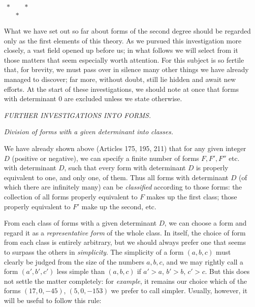 \begin{center}
$\begin{array}{ccc}\ast&&\ast\\&\ast&\end{array}$
\end{center}

What we have set out so far about forms of the second degree should be regarded only as the first elements of this theory. As we pursued this investigation more closely, a vast field opened up before us; in what follows we will select from it those matters that seem especially worth attention. For this subject is so fertile that, for brevity, we must pass over in silence many other things we have already managed to discover; far more, without doubt, still lie hidden and await new efforts. At the start of these investigations, we should note at once that forms with determinant $0$ are excluded unless we state otherwise.

\begin{center}
\textit{FURTHER INVESTIGATIONS INTO FORMS.}
\end{center}

\begin{center}
\textit{Division of forms with a given determinant into classes.}
\end{center}

We have already shown above (Articles 175, 195, 211) that for any given integer $D$ (positive or negative), we can specify a finite number of forms $F,F',F''$ etc. with determinant $D$, such that every form with determinant $D$ is properly equivalent to one, and only one, of them. Thus all forms with determinant $D$ (of which there are infinitely many) can be \textit{classified} according to those forms: the collection of all forms properly equivalent to $F$ makes up the first class; those properly equivalent to $F'$ make up the second, etc.

From each class of forms with a given determinant $D$, we can choose a form and regard it as a \textit{representative form} of the whole class. In itself, the choice of form from each class is entirely arbitrary, but we should always prefer one that seems to surpass the others in \textit{simplicity}. The simplicity of a form $(a,b,c)$ must clearly be judged from the size of the numbers $a,b,c$, and we may rightly call a form $(a',b',c')$ less simple than $(a,b,c)$ if $a'>a$, $b'>b$, $c'>c$. But this does not settle the matter completely: for \textit{example}, it remains our choice which of the forms $(17,0,-45)$, $(5,0,-153)$ we prefer to call simpler. Usually, however, it will be useful to follow this rule:

